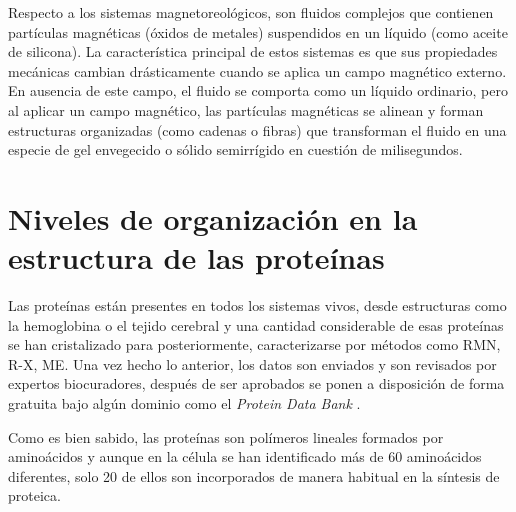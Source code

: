 Respecto a los sistemas magnetoreol\'{o}gicos, son fluidos complejos que contienen part\'{i}culas magn\'{e}ticas (\'{o}xidos de metales) suspendidos en un l\'{i}quido (como aceite de silicona). La caracter\'{i}stica principal de estos sistemas es que sus propiedades mec\'{a}nicas cambian dr\'{a}sticamente cuando se aplica un campo magn\'{e}tico externo. En ausencia de este campo, el ﬂuido se comporta como un l\'{i}quido ordinario, pero al aplicar un campo magn\'{e}tico, las part\'{i}culas magn\'{e}ticas se alinean y forman estructuras organizadas (como cadenas o ﬁbras) que transforman el ﬂuido en una especie de gel envegecido o s\'{o}lido semirr\'{i}gido en cuesti\'{o}n de milisegundos. 

 
 
 
\section{Niveles de organizaci\'{o}n en la estructura de las prote\'{i}nas}


Las prote\'{i}nas est\'{a}n presentes en todos los sistemas vivos, desde estructuras como la hemoglobina o el tejido cerebral y una cantidad considerable de esas prote\'{i}nas se han cristalizado para
posteriormente, caracterizarse por m\'{e}todos como RMN, R-X, ME. Una vez hecho lo anterior, los datos son enviados y son revisados por expertos biocuradores, despu\'{e}s de
ser aprobados se ponen a disposici\'{o}n de forma gratuita bajo alg\'{u}n dominio como el \textit{Protein Data Bank} \cite{bib:Pdb-bank}.

Como es bien sabido, las prote\'{i}nas son pol\'{i}meros lineales formados por amino\'{a}cidos y aunque en la c\'{e}lula se han identificado m\'{a}s de 60 amino\'{a}cidos diferentes, solo 20 de ellos son incorporados de manera habitual en la s\'{i}ntesis de proteica.

